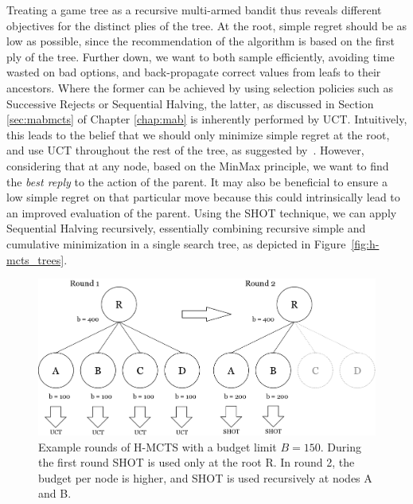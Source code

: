 \documentclass{kecsmstr}
\begin{document}
Treating a game tree as a recursive multi-armed bandit thus reveals different objectives for the distinct plies of the tree. At the root, simple regret should be as low as possible, since the recommendation of the algorithm is based on the first ply of the tree. Further down, we want to both sample efficiently, avoiding time wasted on bad options, and back-propagate correct values from leafs to their ancestors. Where the former can be achieved by using selection policies such as Successive Rejects or Sequential Halving, the latter, as discussed in Section \ref{sec:mabmcts} of Chapter \ref{chap:mab} is inherently performed by UCT. Intuitively, this leads to the belief that we should only minimize simple regret at the root, and use UCT throughout the rest of the tree, as suggested by~. 
However, considering that at any node, based on the MinMax principle, we want to find the \emph{best reply} to the action of the parent. It may also be beneficial to ensure a low simple regret on that particular move because this could intrinsically lead to an improved evaluation of the parent. Using the SHOT technique, we can apply Sequential Halving recursively, essentially combining recursive simple and cumulative minimization in a single search tree, as depicted in Figure~\ref{fig:h-mcts_trees}.

\begin{figure}[ht]
	\centering
	\includegraphics[width=.8\textwidth]{img/H-MCTS_Rounds.png}
	\caption{Example rounds of H-MCTS with a budget limit $B = 150$. During the first round SHOT is used only at the root R. In round 2, the budget per node is higher, and SHOT is used recursively at nodes A and B.}
	\label{fig:h-mcts_rounds}
\end{figure}
\end{document}
